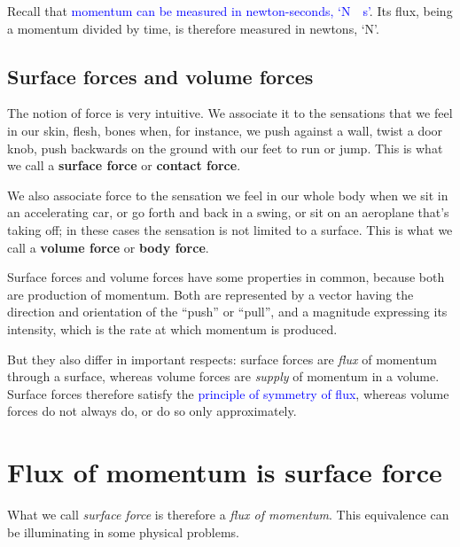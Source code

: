 \documentclass[a4paper,12pt,%
onecolumn,oneside,%
british%
]{memoir}
\renewcommand*{\|}[1][]{\nonscript\:#1\vert\nonscript\:\mathopen{}}
\newcommand*{\sect}{\S}%
\renewcommand*{\autoref}[2]{\sidepar{\vspace{-1ex}\footnotesize{\color{blue}\faIcon{%
angle-right%
}\enskip\sect~\ref{#1} page~\pageref{#1}}}\textcolor{blue}{#2}}
\begin{document}
Recall that \autoref{sec:intro_momentum}{momentum can be measured in newton-seconds, \enquote*{\unit{N\cdot s}}}. Its flux, being a momentum divided by time, is therefore measured in newtons, \enquote*{\unit{N}}.

\subsection{Surface forces and volume forces}
\label{sec:contact_volume_forces}

The notion of force is very intuitive. We associate it to the sensations that we feel in our skin, flesh, bones when, for instance, we push against a wall, twist a door knob, push backwards on the ground with our feet to run or jump. This is what we call a \textbf{surface force} or \textbf{contact force}.

We also associate force to the sensation we feel in our whole body when we sit in an accelerating car, or go forth and back in a swing, or sit on an aeroplane that's taking off; in these cases the sensation is not limited to a surface. This is what we call a \textbf{volume force} or \textbf{body force}.

Surface forces and volume forces have some properties in common, because both are production of momentum. Both are represented by a vector having the direction and orientation of the \enquote{push} or \enquote{pull}, and a magnitude expressing its intensity, which is the rate at which momentum is produced.

But they also differ in important respects: surface forces are \emph{flux} of momentum through a surface, whereas volume forces are \emph{supply} of momentum in a volume. Surface forces therefore satisfy the \autoref{def:symmetryflux}{principle of symmetry of flux}, whereas volume forces do not always do, or do so only approximately.

\section{Flux of momentum is surface force}
\label{sec:visualize_force}

What we call \emph{surface force} is therefore a \emph{flux of momentum}. This equivalence can be illuminating in some physical problems.
\end{document}
